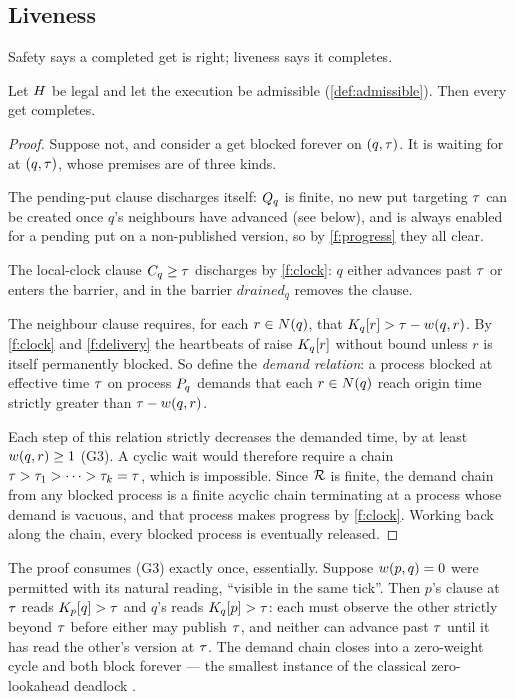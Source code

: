 \subsection{Liveness}
\label{sec:l1-liveness}

Safety says a completed get is right; liveness says it completes.

\begin{theorem}\label{thm:deadlock-freedom}
Let $H$ be legal and let the execution be admissible
(\cref{def:admissible}). Then every get completes.
\end{theorem}

\begin{proof}
Suppose not, and consider a get blocked forever on $(q, \tau)$. It is waiting
for  at $(q,\tau)$, whose premises are of three kinds.

The pending-put clause discharges itself: $Q_{q}$ is finite, no new put
targeting $\tau$ can be created once $q$'s neighbours have advanced (see
below), and  is always enabled for a pending put on a
non-published version, so by \ref{f:progress} they all clear.

The local-clock clause $C_{q} \ge \tau$ discharges by \ref{f:clock}: $q$
either advances past $\tau$ or enters the barrier, and in the barrier
$\mathit{drained}_q$ removes the clause.

The neighbour clause requires, for each $r \in N(q)$, that
$K_{q}[r] > \tau - w(q,r)$. By \ref{f:clock} and \ref{f:delivery} the
heartbeats of  raise $K_{q}[r]$ without bound unless $r$ is
itself permanently blocked. So define the \emph{demand relation}: a process
blocked at effective time $\tau$ on process $P_{q}$ demands that each
$r \in N(q)$ reach origin time strictly greater than
$\tau - w(q,r)$.

Each step of this relation strictly decreases the demanded time, by at least
$w(q,r) \ge 1$ (G3). A cyclic wait would therefore require a chain
$\tau > \tau_1 > \dots > \tau_k = \tau$, which is impossible. Since $\mathcal{R}$
is finite, the demand chain from any blocked process is a finite acyclic chain
terminating at a process whose demand is vacuous, and that process makes progress
by \ref{f:clock}. Working back along the chain, every blocked process is
eventually released.
\end{proof}

\begin{remark}\label{rem:zero-cycle}
The proof consumes (G3) exactly once, essentially. Suppose $w(p,q) = 0$
were permitted with its natural reading, ``visible in the same tick''. Then
$p$'s  clause at $\tau$ reads $K_{p}[q] > \tau$ and $q$'s reads
$K_{q}[p] > \tau$: each must observe the other strictly beyond $\tau$ before
either may publish $\tau$, and neither can advance past $\tau$ until it has
read the other's version at $\tau$. The demand chain closes into a zero-weight
cycle and both block forever --- the smallest instance of the classical
zero-lookahead deadlock \cite{chandy1979} .
\end{remark}

